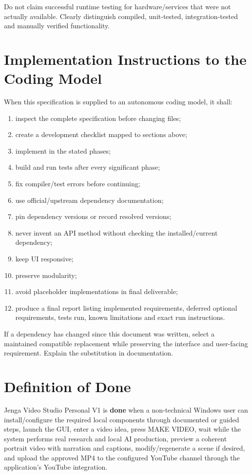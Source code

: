 \documentclass[10pt,journal,compsoc]{IEEEtran}
\begin{document}
Do not claim successful runtime testing for hardware/services that were not actually available. Clearly distinguish compiled, unit-tested, integration-tested and manually verified functionality.

\section{Implementation Instructions to the Coding Model}

When this specification is supplied to an autonomous coding model, it shall:
\begin{enumerate}
    \item inspect the complete specification before changing files;
    \item create a development checklist mapped to sections above;
    \item implement in the stated phases;
    \item build and run tests after every significant phase;
    \item fix compiler/test errors before continuing;
    \item use official/upstream dependency documentation;
    \item pin dependency versions or record resolved versions;
    \item never invent an API method without checking the installed/current dependency;
    \item keep UI responsive;
    \item preserve modularity;
    \item avoid placeholder implementations in final deliverable;
    \item produce a final report listing implemented requirements, deferred optional requirements, tests run, known limitations and exact run instructions.
\end{enumerate}

If a dependency has changed since this document was written, select a maintained compatible replacement while preserving the interface and user-facing requirement. Explain the substitution in documentation.

\section{Definition of Done}

Jenga Video Studio Personal V1 is \textbf{done} when a non-technical Windows user can install/configure the required local components through documented or guided steps, launch the GUI, enter a video idea, press MAKE VIDEO, wait while the system performs real research and local AI production, preview a coherent portrait video with narration and captions, modify/regenerate a scene if desired, and upload the approved MP4 to the configured YouTube channel through the application's YouTube integration.
\end{document}
